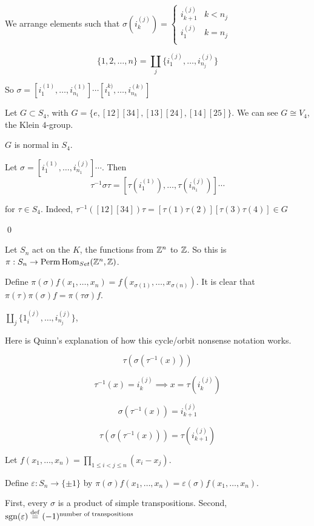 \documentclass[x11names,reqno,14pt]{extarticle}
\DeclareMathOperator{\Perm}{Perm}
\begin{document}
We arrange elements such that $\sigma(i_k^{(j)}) =\begin{cases} i_{k + 1}^{(j)} & k < n_j \\ i_1^{(j)} & k = n_j \\ \end{cases}$

\[
\{1,2,\dots,n\} = \coprod_j\{i_1^{(j)}, \dots, i_{n_j}^{(j)}\}
\]



So $\sigma = [i_1^{(1)}, \dots, i_{n_1}^{(1)}]\cdots[i_1^{k)},\dots,i_{n_k}^{(k)}]$

Let $G \subset S_4$, with $G = \{e, [12][34], [13][24], [14][25]\}$. We can see $G \cong V_4$, the Klein $4$-group. 

\claim

$G$ is normal in $S_4$. 

\proof

Let $\sigma = [i_1^{(1)}, \dots, i_{n_1}^{(j)}]\cdots$. Then
\[
\tau^{-1}\sigma\tau = [\tau(i_1^{(1)}), \dots, \tau(i_{n_1}^{(j)})]\cdots
\]

for $\tau \in S_4$. Indeed, $\tau^{-1}([12][34])\tau = [\tau(1)\tau(2)][\tau(3)\tau(4)] \in G$

\qed

Let $S_n$ act on the $K$, the functions from $\mathbb{Z}^n$ to $\mathbb{Z}$. So this is $\pi:S_n\to\Perm\Hom_{Set}(\Z^n, \Z)$. 

Define $\pi(\sigma)f(x_1, \dots, x_n) = f(x_{\sigma(1)}, \dots, x_{\sigma(n)})$. It is clear that $\pi(\tau)\pi(\sigma)f = \pi(\tau\sigma)f$. 

$\coprod_j\{1_i^{(j)},\dots,i_{n_j}^{(j)}\}$, 

Here is Quinn's explanation of how this cycle/orbit nonsense notation works. 

\[
\tau(\sigma(\tau^{-1}(x)))
\]

\[
\tau^{-1}(x) = i_k^{(j)} \implies x = \tau(i_k^{(j)})
\]

\[
\sigma(\tau^{-1}(x)) = i_{k +1}^{(j)}
\]

\[
\tau(\sigma(\tau^{-1}(x))) = \tau(i_{k + 1}^{(j)})
\]

Let $f(x_1, \dots, x_n) = \prod_{1\leq i<j\leq n}(x_i - x_j)$. 

Define $\varepsilon:S_n\to\{\pm 1\}$ by $\pi(\sigma)f(x_1, \dots, x_n) = \varepsilon(\sigma)f(x_1, \dots, x_n)$. 

\prop

First, every $\sigma$ is a product of simple transpositions. Second, $\operatorname{sgn}(\varepsilon) \overset{\mathrm{def}}{=} (-1)^{\text{number of transpositions}}$
\end{document}
